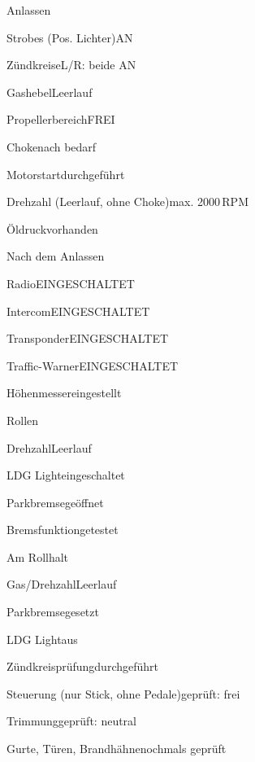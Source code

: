 \begin{checklist}{Anlassen}
	\item{Strobes (Pos. Lichter)}{AN}
	\item{Zündkreise}{L/R: beide AN}
	\item{Gashebel}{Leerlauf}
	\item{Propellerbereich}{FREI}
	\item{Choke}{nach bedarf}
	\item{Motorstart}{durchgeführt}
	\item{Drehzahl (Leerlauf, ohne Choke)}{max. 2000\,RPM}
	\item{Öldruck}{vorhanden}
\end{checklist}


\begin{checklist}{Nach dem Anlassen}
	\item{Radio}{EINGESCHALTET}
	\item{Intercom}{EINGESCHALTET}
	\item{Transponder}{EINGESCHALTET}
	\item{Traffic-Warner}{EINGESCHALTET}
	\item{Höhenmesser}{eingestellt}
\end{checklist}


\begin{checklist}{Rollen}
	\item{Drehzahl}{Leerlauf}
	\item{LDG Light}{eingeschaltet}
	\item{Parkbremse}{geöffnet}
	  \item{Bremsfunktion}{getestet}
\end{checklist}


\begin{checklist}{Am Rollhalt}
	\item{Gas/Drehzahl}{Leerlauf}
	\item{Parkbremse}{gesetzt}
	\item{LDG Light}{aus}
	\item{Zündkreisprüfung}{durchgeführt}
	\item{Steuerung (nur Stick, ohne Pedale)}{geprüft: frei}
	\item{Trimmung}{geprüft: neutral}
	\item{Gurte, Türen, Brandhähne}{nochmals geprüft}
\end{checklist}

